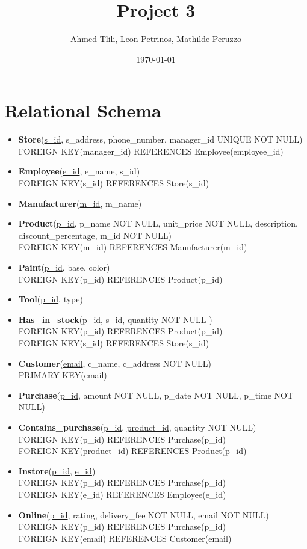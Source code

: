 \documentclass[a4paper,11pt]{article}
\title{Project 3}
\author{Ahmed Tlili, Leon Petrinos, Mathilde Peruzzo}
\date{\today}
\begin{document}
\maketitle

\section{Relational Schema}
\begin{itemize}
    \item \textbf{Store}(\underline{s\_id}, s\_address, phone\_number, manager\_id UNIQUE NOT NULL)\\
        FOREIGN KEY(manager\_id) REFERENCES Employee(employee\_id)
    \item \textbf{Employee}(\underline{e\_id}, e\_name, s\_id)\\
        FOREIGN KEY(s\_id) REFERENCES Store(s\_id)
    \item \textbf{Manufacturer}(\underline{m\_id}, m\_name)
    \item \textbf{Product}(\underline{p\_id}, p\_name NOT NULL, unit\_price NOT NULL, description,\\ discount\_percentage, m\_id NOT NULL)\\
        FOREIGN KEY(m\_id) REFERENCES Manufacturer(m\_id)
    \item \textbf{Paint}(\underline{p\_id}, base, color)\\
        FOREIGN KEY(p\_id) REFERENCES Product(p\_id)
    \item \textbf{Tool}(\underline{p\_id}, type)
    \item \textbf{Has\_in\_stock}(\underline{p\_id}, \underline{s\_id}, quantity NOT NULL )\\
        FOREIGN KEY(p\_id) REFERENCES Product(p\_id)\\
        FOREIGN KEY(s\_id) REFERENCES Store(s\_id)
    \item \textbf{Customer}(\underline{email}, c\_name, c\_address NOT NULL)\\
        PRIMARY KEY(email)
    \item \textbf{Purchase}(\underline{p\_id}, amount NOT NULL, p\_date NOT NULL, p\_time NOT NULL)
    \item \textbf{Contains\_purchase}(\underline{p\_id}, \underline{product\_id}, quantity NOT NULL)\\
        FOREIGN KEY(p\_id) REFERENCES Purchase(p\_id)\\
        FOREIGN KEY(product\_id) REFERENCES Product(p\_id)
    \item \textbf{Instore}(\underline{p\_id}, \underline{e\_id})\\
        FOREIGN KEY(p\_id) REFERENCES Purchase(p\_id)\\
        FOREIGN KEY(e\_id) REFERENCES Employee(e\_id)
    \item \textbf{Online}(\underline{p\_id}, rating, delivery\_fee NOT NULL, email NOT NULL)\\
        FOREIGN KEY(p\_id) REFERENCES Purchase(p\_id)\\
        FOREIGN KEY(email) REFERENCES Customer(email)
\end{itemize}
\end{document}
